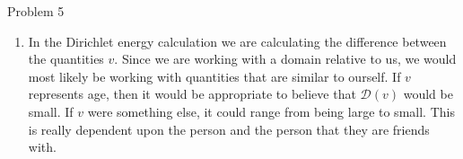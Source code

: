 \begin{problem}{Problem 5}
\begin{highlight}
        \begin{enumerate}[label = (\alph*), start = 2]
            \item In the Dirichlet energy calculation we are calculating the difference between the quantities $v$. Since we are working with a domain relative to us, we would most likely be working with quantities
            that are similar to ourself. If $v$ represents age, then it would be appropriate to believe that $\mathcal{D}(v)$ would be small. If $v$ were something else, it could range from being large to small.
            This is really dependent upon the person and the person that they are friends with.
        \end{enumerate}
    \end{highlight}
\end{problem}

